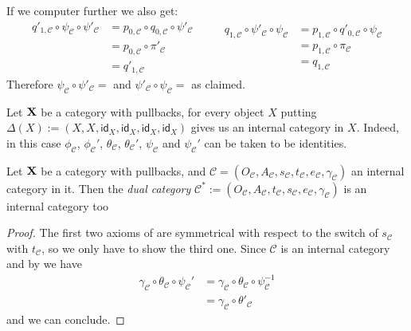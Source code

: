 \documentclass[a4paper,UKenglish,cleveref,pdftex,thm-restate,numberwithinsect]{lipics-v2021}
\newcommand{\id}[1]{\mathsf{id}_{#1}}
\def\X{\textbf {\textup{X}}}
\begin{document}
\begin{remark}
If we computer further we also get:
\[\begin{split}
	q'_{1, \mathcal{C}}\circ \psi_{\mathcal{C}} \circ \psi'_{\mathcal{C}}&= p_{0, \mathcal{C}} \circ q_{0, \mathcal{C}}\circ \psi'_{\mathcal{C}}\\&= p_{0, \mathcal{C}} \circ \pi'_{\mathcal{C}}\\&=q'_{1, \mathcal{C}}
\end{split} \qquad \begin{split}
	q_{1, \mathcal{C}}\circ \psi'_{\mathcal{C}} \circ \psi_{\mathcal{C}}&= p_{1, \mathcal{C}} \circ q'_{0, \mathcal{C}}\circ \psi_{\mathcal{C}}\\&= p_{1, \mathcal{C}} \circ \pi_{\mathcal{C}}\\&=q_{1, \mathcal{C}}
\end{split}\]
Therefore $\psi_{\mathcal{C}}\circ \psi'_{\mathcal{C}}=$ and $\psi'_{\mathcal{C}}\circ \psi_{\mathcal{C}}=$ as claimed.
 \end{remark}

\begin{example}\label{ex:disc}
	Let $\X$ be a category with pullbacks, for every object $X$ putting $\Delta(X):=(X, X, \id{X}, \id{X}, \id{X}, \id{X})$ gives us an internal category in $X$. Indeed, in this case $\phi_{\mathcal{C}}$, $\phi_{\mathcal{C}}'$, $\theta_{\mathcal{C}}$, $\theta_{\mathcal{C}}'$, $\psi_{\mathcal{C}}$ and $\psi_{\mathcal{C}}'$ can be taken to be identities.
\end{example}


\begin{proposition} \label{prop:dual}Let $\X$ be a category with pullbacks, and
 $\mathcal{C}=(O_{\mathcal{C}}, A_{\mathcal{C}}, s_{\mathcal{C}}, t_{\mathcal{C}}, e_{\mathcal{C}}, \gamma_{\mathcal{C}})$ an internal category in it. Then the \emph{dual category} $\mathcal{C}^*:=(O_{\mathcal{C}}, A_{\mathcal{C}}, t_{\mathcal{C}}, s_{\mathcal{C}}, e_{\mathcal{C}}, \gamma_{\mathcal{C}})$ is an internal category too
\end{proposition}
\begin{proof}
The first two axioms of  are symmetrical with respect to the switch of $s_{\mathcal{C}}$ with $t_{\mathcal{C}}$, so we only have to show the third one. Since $\mathcal{C}$ is an internal category and by  we have
\begin{align*}
\gamma_{\mathcal{C}}\circ \theta_{\mathcal{C}} \circ \psi_{\mathcal{C}}' &=\gamma_{\mathcal{C}} \circ \theta_{\mathcal{C}} \circ \psi^{-1}_{\mathcal{C}}\\ & =	\gamma_{\mathcal{C}}\circ \theta'_{\mathcal{C}} 
\end{align*}
and we can conclude.
\end{proof}
\end{document}
